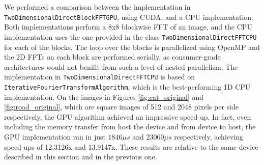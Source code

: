 We performed a comparison between the implementation in \texttt{Two\-Dimensional\-Direct\-Block\-FFT\-GPU}, using CUDA, and a CPU implementation. Both implementations perform a 8x8 blockwise FFT of an image, and the CPU implementation uses the one provided in the class \texttt{Two\-Dimensional\-Direct\-FFT\-CPU} for each of the blocks. The loop over the blocks is parallelized using OpenMP and the 2D FFTs on each block are performed serially, as consumer-grade architectures would not benifit from such a level of nested parallelism. The implementation in \texttt{Two\-Dimensional\-Direct\-FFT\-CPU} is based on \texttt{Iterative\-Fourier\-Transform\-Algorithm}, which is the best-performing 1D CPU implementation. On the images in Figures \ref{fig:cat_original} and \ref{fig:road_original}, which are square images of 512 and 2048 pixels per side respectively, the GPU algorithm achieved an impressive speed-up. In fact, even including the memory transfer from host the device and from device to host, the GPU implementation ran in just $1846 \mu s$ and $23060 \mu s$ respectively, achieving speed-ups of 12.3126x and 13.9147x. These results are relative to the same device described in this section and in the previous one.